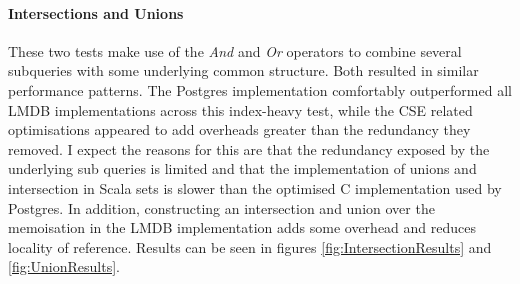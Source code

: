 \documentclass[12pt,a4paper,twoside,openright]{report}
\newcommand\mathName[1]{\textit{#1}}
\let\oldparagraph\paragraph
\renewcommand{\paragraph}[1]{\oldparagraph{#1}\mbox{}}
\begin{document}
		\paragraph{Intersections and Unions}
	These two tests make use of the \mathName{And} and  \mathName{Or} operators to combine several subqueries with some underlying common structure. Both resulted in similar performance patterns. The Postgres implementation comfortably outperformed all LMDB implementations across this index-heavy test, while the CSE related optimisations appeared to add overheads greater than the redundancy they removed. I expect the reasons for this are that the redundancy exposed by the underlying sub queries is limited and that the implementation of unions and intersection in Scala sets is slower than the optimised C implementation used by Postgres. In addition, constructing an intersection and union over the memoisation in the LMDB implementation adds some overhead and reduces locality of reference.	Results can be seen in figures \ref{fig:IntersectionResults} and \ref{fig:UnionResults}.
\end{document}
